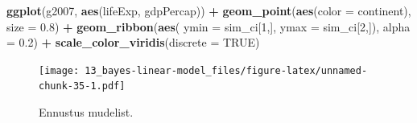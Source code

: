 \documentclass[]{book}
\newenvironment{Shaded}{\begin{snugshade}}{\end{snugshade}}
\newcommand{\KeywordTok}[1]{\textcolor[rgb]{0.13,0.29,0.53}{\textbf{#1}}}
\newcommand{\DataTypeTok}[1]{\textcolor[rgb]{0.13,0.29,0.53}{#1}}
\newcommand{\DecValTok}[1]{\textcolor[rgb]{0.00,0.00,0.81}{#1}}
\newcommand{\FloatTok}[1]{\textcolor[rgb]{0.00,0.00,0.81}{#1}}
\newcommand{\StringTok}[1]{\textcolor[rgb]{0.31,0.60,0.02}{#1}}
\newcommand{\CommentTok}[1]{\textcolor[rgb]{0.56,0.35,0.01}{\textit{#1}}}
\newcommand{\OtherTok}[1]{\textcolor[rgb]{0.56,0.35,0.01}{#1}}
\newcommand{\OperatorTok}[1]{\textcolor[rgb]{0.81,0.36,0.00}{\textbf{#1}}}
\newcommand{\NormalTok}[1]{#1}
\begin{document}
\begin{Shaded}
\end{Shaded}

\begin{Shaded}
\begin{Highlighting}[]
\KeywordTok{ggplot}\NormalTok{(g2007, }\KeywordTok{aes}\NormalTok{(lifeExp, gdpPercap)) }\OperatorTok{+}\StringTok{ }
\StringTok{  }\KeywordTok{geom_point}\NormalTok{(}\KeywordTok{aes}\NormalTok{(}\DataTypeTok{color =}\NormalTok{ continent), }\DataTypeTok{size =} \FloatTok{0.8}\NormalTok{) }\OperatorTok{+}
\StringTok{  }\KeywordTok{geom_ribbon}\NormalTok{(}\KeywordTok{aes}\NormalTok{( }\DataTypeTok{ymin =}\NormalTok{ sim_ci[}\DecValTok{1}\NormalTok{,], }\DataTypeTok{ymax =}\NormalTok{ sim_ci[}\DecValTok{2}\NormalTok{,]), }\DataTypeTok{alpha =} \FloatTok{0.2}\NormalTok{) }\OperatorTok{+}
\StringTok{  }\KeywordTok{scale_color_viridis}\NormalTok{(}\DataTypeTok{discrete =} \OtherTok{TRUE}\NormalTok{)}
\end{Highlighting}
\end{Shaded}

\begin{figure}
\centering
\texttt{[image: 13\_bayes-linear-model\_files/figure-latex/unnamed-chunk-35-1.pdf]}
\caption{\label{fig:unnamed-chunk-35}Ennustus mudelist.}
\end{figure}
\end{document}
